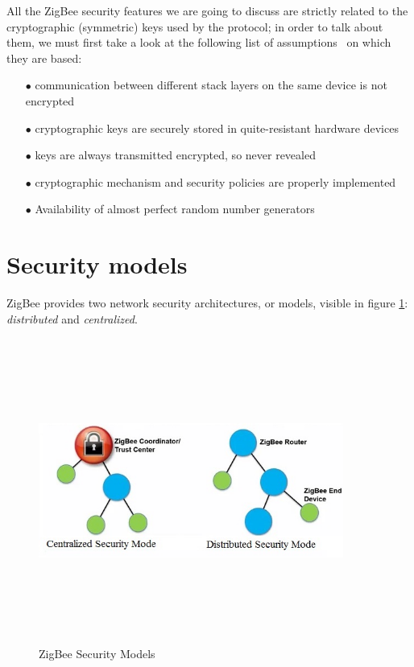 \documentclass[12pt]{report}
\begin{document}
{{All the ZigBee security features we are going to discuss are strictly related to the cryptographic (symmetric) keys used by the protocol; in order to talk about them, we must first take a look at the following list of assumptions~\cite{secanalysisofzigbee} on which they are based:

\begin{itemize}
\setlength{\itemindent}{+4mm}
\item[$\bullet$] communication between different stack layers on the same device is not encrypted
\item[$\bullet$] cryptographic keys are securely stored in quite-resistant hardware devices
\item[$\bullet$] keys are always transmitted encrypted, so never revealed
\item[$\bullet$] cryptographic mechanism and security policies are properly implemented
\item[$\bullet$] Availability of almost perfect random number generators\\
\end{itemize}

\clearpage
\section{Security models}
\bigskip

ZigBee provides two network security architectures, or models, visible in figure \ref{fig:zigbeemodels}: \emph{distributed} and \emph{centralized}.\\

\begin{figure}[H]
\includegraphics[width=10cm,height=10cm,keepaspectratio]{security_models}
\centering
\caption{ZigBee Security Models}
\label{fig:zigbeemodels}
\end{figure}

}}
\end{document}
